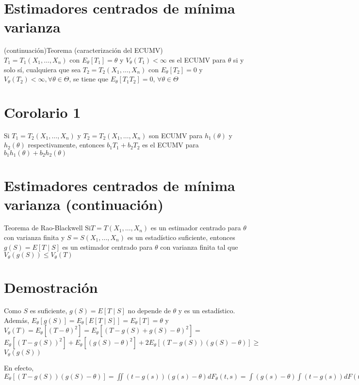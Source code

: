 \section*{Estimadores centrados de mínima varianza}
 (continuación)Teorema (caracterización del ECUMV)\\
$T_{1}=T_{1}\left(X_{1}, \ldots, X_{n}\right)$ con $E_{\theta}\left[T_{1}\right]=\theta$ y $V_{\theta}\left(T_{1}\right)<\infty$ es el ECUMV para $\theta$ si y solo sí, cualquiera que sea $T_{2}=T_{2}\left(X_{1}, \ldots, X_{n}\right)$ con $E_{\theta}\left[T_{2}\right]=0$ y $V_{\theta}\left(T_{2}\right)<\infty, \forall \theta \in \Theta$, se tiene que $E_{\theta}\left[T_{1} T_{2}\right]=0$, $\forall \theta \in \Theta$

\section*{Corolario 1}
Si $T_{1}=T_{2}\left(X_{1}, \ldots, X_{n}\right)$ y $T_{2}=T_{2}\left(X_{1}, \ldots, X_{n}\right)$ son ECUMV para $h_{1}(\theta)$ y $h_{2}(\theta)$ respectivamente, entonces $b_{1} T_{1}+b_{2} T_{2}$ es el ECUMV para $b_{1} h_{1}(\theta)+b_{2} h_{2}(\theta)$

\section*{Estimadores centrados de mínima varianza (continuación)}
Teorema de Rao-Blackwell $\mathrm{Si} T=T\left(X_{1}, \ldots, X_{n}\right)$ es un estimador centrado para $\theta$ con varianza finita y $S=S\left(X_{1}, \ldots, X_{n}\right)$ es un estadístico suficiente, entonces $g(S)=E[T \mid S]$ es un estimador centrado para $\theta$ con varianza finita tal que $V_{\theta}(g(S)) \leq V_{\theta}(T)$

\section*{Demostración}
Como $S$ es suficiente, $g(S)=E[T \mid S]$ no depende de $\theta$ y es un estadístico. Además, $E_{\theta}[g(S)]=E_{\theta}[E[T \mid S]]=E_{\theta}[T]=\theta$ y\\
$V_{\theta}(T)=E_{\theta}\left[(T-\theta)^{2}\right]=E_{\theta}\left[(T-g(S)+g(S)-\theta)^{2}\right]=$ $E_{\theta}\left[(T-g(S))^{2}\right]+E_{\theta}\left[(g(S)-\theta)^{2}\right]+2 E_{\theta}[(T-g(S))(g(S)-\theta)] \geq$ $V_{\theta}(g(S))$

En efecto, $E_{\theta}[(T-g(S))(g(S)-\theta)]=\iint(t-g(s))(g(s)-\theta) d F_{\theta}(t, s)=\int(g(s)-\theta) \int(t-g(s)) d F(t \mid s) d F_{\theta}(s)=0$

